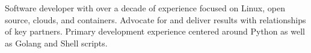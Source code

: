 


\begin{cvparagraph}

Software developer with over a decade of experience focused on Linux, open
source, clouds, and containers. Advocate for and deliver results with
relationships of key partners. Primary development experience centered around
Python as well as Golang and Shell scripts.

\end{cvparagraph}

